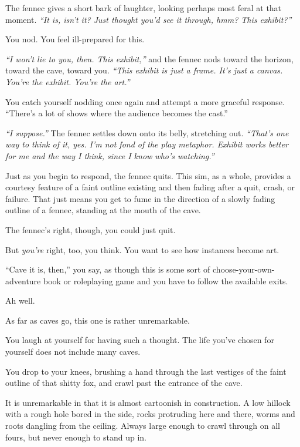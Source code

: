 The fennec gives a short bark of laughter, looking perhaps most feral at that moment. \emph{``It is, isn't it? Just thought you'd see it through, hmm? This exhibit?''}

You nod. You feel ill-prepared for this.

\emph{``I won't lie to you, then. This exhibit,''} and the fennec nods toward the horizon, toward the cave, toward you. \emph{``This exhibit is just a frame. It's just a canvas. You're the exhibit. You're the art.''}

You catch yourself nodding once again and attempt a more graceful response. ``There's a lot of shows where the audience becomes the cast.''

\emph{``I suppose.''} The fennec settles down onto its belly, stretching out. \emph{``That's one way to think of it, yes. I'm not fond of the play metaphor. Exhibit works better for me and the way I think, since I know who's watching.''}

Just as you begin to respond, the fennec quits. This sim, as a whole, provides a courtesy feature of a faint outline existing and then fading after a quit, crash, or failure. That just means you get to fume in the direction of a slowly fading outline of a fennec, standing at the mouth of the cave.

The fennec's right, though, you could just quit.

But \emph{you're} right, too, you think. You want to see how instances become art.

``Cave it is, then,'' you say, as though this is some sort of choose-your-own-adventure book or roleplaying game and you have to follow the available exits.

Ah well.

\newpage
\null
\vfill

As far as caves go, this one is rather unremarkable.

You laugh at yourself for having such a thought. The life you've chosen for yourself does not include many caves.

You drop to your knees, brushing a hand through the last vestiges of the faint outline of that shitty fox, and crawl past the entrance of the cave.

It is unremarkable in that it is almost cartoonish in construction. A low hillock with a rough hole bored in the side, rocks protruding here and there, worms and roots dangling from the ceiling. Always large enough to crawl through on all fours, but never enough to stand up in.

